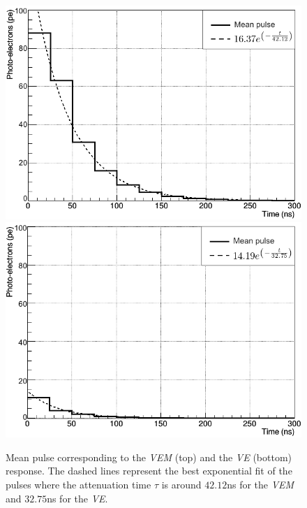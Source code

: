 \documentclass[submitting]{nst}
\begin{document}
\begin{figure}
    \centering
    \includegraphics[scale=0.35]{Figures/pulse_vem.png}
    \includegraphics[scale=0.35]{Figures/pulse_ve.png}
    \caption{Mean pulse corresponding to the \textsl{VEM} (top) and the \textsl{VE} (bottom) response. The dashed lines represent the best exponential fit of the pulses where the attenuation time $\tau$ is around $42.12$ns for the \textsl{VEM} and $32.75$ns for the \textsl{VE}.}
    \label{pulse_vem_ve}
\end{figure}
\end{document}
